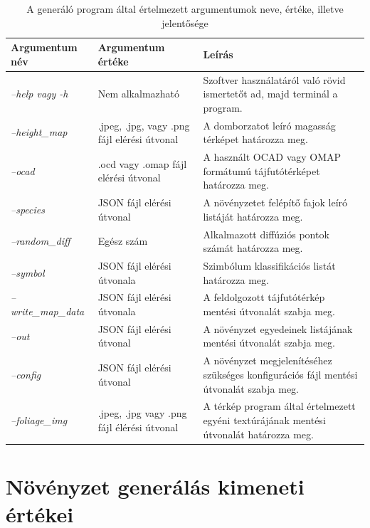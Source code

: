\begin{table}[H]
    \centering
    \begin{tabular}{| m{} | m{} |  m{}  |}
        \hline
        \textbf{Argumentum név} & \textbf{Argumentum értéke} & \textbf{Leírás} \\
        \hline
        \hline
        \emph{--help vagy -h} & Nem alkalmazható  & Szoftver használatáról való rövid ismertetőt ad, majd terminál a program.\\
        \hline
        \emph{--height\_map} & .jpeg, .jpg, vagy .png fájl elérési útvonal & A domborzatot leíró magasság térképet határozza meg. \\
        \hline
        \emph{--ocad} & .ocd vagy .omap fájl elérési útvonal & A használt OCAD vagy OMAP formátumú tájfutótérképet határozza meg. \\
        \hline
        \emph{--species} & JSON fájl elérési útvonal & A növényzetet felépítő fajok leíró listáját határozza meg. \\
        \hline
        \emph{--random\_diff} & Egész szám &  Alkalmazott diffúziós pontok számát határozza meg. \\
        \hline
        \emph{--symbol} & JSON fájl elérési útvonala & Szimbólum klassifikációs listát határozza meg.\\
        \hline
        \emph{--write\_map\_data} & JSON fájl elérési útvonala & A feldolgozott tájfutótérkép mentési útvonalát szabja meg.\\
        \hline
        \emph{--out} & JSON fájl elérési útvonal & A növényzet egyedeinek listájának mentési útvonalát szabja meg.\\
        \hline
        \emph{--config} & JSON fájl elérési útvonal & A növényzet megjelenítéséhez szükséges konfigurációs fájl mentési útvonalát szabja meg.\\
        \hline
        \emph{--foliage\_img} & .jpeg, .jpg vagy .png fájl élérési útvonal & A térkép program által értelmezett egyéni textúrájának mentési útvonalát határozza meg.\\
        \hline
    \end{tabular}

    \caption{A generáló program által értelmezett argumentumok neve, értéke, illetve jelentősége}
    \label{tab:generator_argumentumok}
\end{table}


\section{Növényzet generálás kimeneti értékei}

